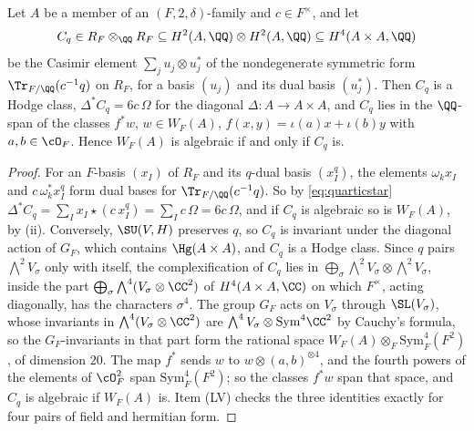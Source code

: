 \begin{proposition}\label{prop:quarticcasimir}
Let $A$ be a member of an $(F,2,\delta)$-family and $c\in F^{\times}$, and let
\[
  C_{q}\in R_{F}\otimes_{\QQ}R_{F}\subseteq H^{2}(A,\QQ)\otimes H^{2}(A,\QQ)
  \subseteq H^{4}(A\times A,\QQ)
\]
be the Casimir element $\sum_{j}u_{j}\otimes u_{j}^{*}$ of the nondegenerate
symmetric form $\Tr_{F/\QQ}(c^{-1}q)$ on $R_{F}$, for a basis $(u_{j})$ and its
dual basis $(u_{j}^{*})$. Then $C_{q}$ is a Hodge class,
$\Delta^{*}C_{q}=6c\,\Omega$ for the diagonal $\Delta\colon A\to A\times A$,
and $C_{q}$ lies in the $\QQ$-span of the classes $f^{*}w$, $w\in W_{F}(A)$,
$f(x,y)=\iota(a)x+\iota(b)y$ with $a,b\in\cO_{F}$. Hence $W_{F}(A)$ is
algebraic if and only if $C_{q}$ is.
\end{proposition}

\begin{proof}
For an $F$-basis $(x_{I})$ of $R_{F}$ and its $q$-dual basis $(x_{I}^{q})$, the
elements $\omega_{k}x_{I}$ and $c\,\omega_{k}^{*}x_{I}^{q}$ form dual bases for
$\Tr_{F/\QQ}(c^{-1}q)$. So by \eqref{eq:quarticstar}
$\Delta^{*}C_{q}=\sum_{I}x_{I}\star(c\,x_{I}^{q})=\sum_{I}c\,\Omega=6c\,\Omega$,
and if $C_{q}$ is algebraic so is $W_{F}(A)$, by (ii).
Conversely, $\SU(V,H)$ preserves $q$, so $C_{q}$ is invariant under the
diagonal action of $G_{F}$, which contains $\Hg(A\times A)$, and $C_{q}$ is a
Hodge class. Since $q$ pairs $\bigwedge^{2}V_{\sigma}$ only with itself, the
complexification of $C_{q}$ lies in $\bigoplus_{\sigma}\bigwedge^{2}V_{\sigma}
\otimes\bigwedge^{2}V_{\sigma}$, inside the part
$\bigoplus_{\sigma}\bigwedge^{4}(V_{\sigma}\otimes\CC^{2})$ of
$H^{4}(A\times A,\CC)$ on which $F^{\times}$, acting diagonally, has the
characters $\sigma^{4}$. The group $G_{F}$ acts on $V_{\sigma}$ through
$\SL(V_{\sigma})$, whose invariants in $\bigwedge^{4}(V_{\sigma}\otimes\CC^{2})$
are $\bigwedge^{4}V_{\sigma}\otimes\mathrm{Sym}^{4}\CC^{2}$ by Cauchy's
formula, so the $G_{F}$-invariants in that part form the rational space
$W_{F}(A)\otimes_{F}\mathrm{Sym}^{4}_{F}(F^{2})$, of dimension $20$. The map
$f^{*}$ sends $w$ to $w\otimes(a,b)^{\otimes4}$, and the fourth powers of the
elements of $\cO_{F}^{2}$ span $\mathrm{Sym}^{4}_{F}(F^{2})$; so the classes
$f^{*}w$ span that space, and $C_{q}$ is algebraic if $W_{F}(A)$ is. Item (LV)
checks the three identities exactly for four pairs of field and hermitian
form.
\end{proof}

